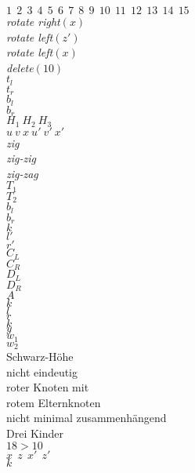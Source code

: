 \documentclass[a4paper,12pt]{article}
\begin{document}
$1~~2~~3~~4~~5~~6~~7~~8~~9~~10~~11~~12~~13~~14~~15$  \\
\textit{rotate right}$\left(x\right)$\\
\textit{rotate left}$\left(z'\right)$\\
\textit{rotate left}$\left(x\right)$\\
\textit{delete}$\left(10\right)$\\
$t_l$\\
$t_r$\\
$b_l$\\
$b_r$\\
$H_1  ~H_2 ~ H_3$\\
$u  ~v ~  x ~ u'  ~v' ~  x' $\\
\textit{zig}\\
\textit{zig-zig}\\
\textit{zig-zag}\\
$T_1$\\
$T_2$\\
$b_l$\\
$b_r$\\
$k$\\
$l'$\\
$r'$\\
$C_L$\\
$C_R$\\
$D_L$\\
$D_R$\\
$A$\\
$k$\\
$l$\\
$r$\\
$k$\\
$y$\\
$w_1$\\
$w_2$\\
\color{Red}
Schwarz-Höhe\\ nicht eindeutig\\
roter Knoten mit\\ rotem Elternknoten\\ 
nicht minimal zusammenhängend\\
Drei Kinder\\
$18 > 10$\\
\color{ForestGreen}   
$x~~z~~x'~~z'$\\
$k$






\newpage


\end{document}
